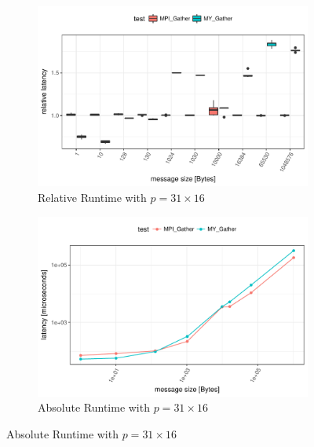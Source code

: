 \begin{figure}[H]
    \centering
    
    \begin{subfigure}[b]{0.49\textwidth}
        \includegraphics[width=\textwidth]{../benchmarks/mpich/binom/gather_31/rel_runtime.pdf}
        \caption{Relative Runtime with $p=31 \times 16$}
        \label{fig:Gather:MPICH:Rel:31}
    \end{subfigure}
    \begin{subfigure}[b]{0.49\textwidth}
        \includegraphics[width=\textwidth]{../benchmarks/mpich/binom/gather_31/runtime.pdf}
        \caption{Absolute Runtime with $p=31 \times 16$}
        \label{fig:Gather:MPICH:Abs:31}
    \end{subfigure}
    

\end{figure}
